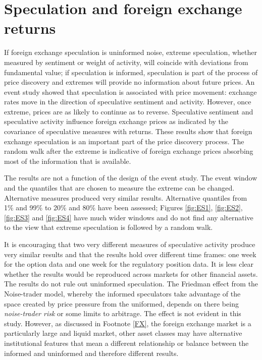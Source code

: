 \documentclass[preprint,12pt,authoryear]{elsarticle}
\begin{document}
\section{Speculation and foreign exchange returns}
If foreign exchange speculation is uninformed noise, extreme speculation, whether measured by sentiment or weight of activity, will coincide with deviations from fundamental value; if speculation is informed, speculation is part of the process of price discovery and extremes will provide no information about future prices. An event study showed that speculation is associated with price movement: exchange rates move in the direction of speculative sentiment and activity.  However, once extreme, prices are as likely to continue as to reverse. Speculative sentiment and speculative activity influence foreign exchange prices as indicated by the covariance of speculative measures with returns.  These results show that foreign exchange speculation is an important part of the price discovery process.  The random walk after the extreme is indicative of foreign exchange prices absorbing most of the information that is available.  
  
The results are not a function of the design of the event study.  The event window and the quantiles that are chosen to measure the extreme can be changed.  Alternative measures produced very similar results. Alternative quantiles from 1\% and 99\% to 20\% and 80\% have been assessed; Figures \ref{fig:ES1}, \ref{fig:ES2}, \ref{fig:ES3} and \ref{fig:ES4} have much wider windows and do not find any alternative to the view that extreme speculation is followed by a random walk. 


It is encouraging that two very different measures of speculative activity produce very similar results and that the results hold over different time frames: one week for the option data and one week for the regulatory position data.  It is less clear whether the results would be reproduced across markets for other financial assets. The results do not rule out uninformed speculation.  The Friedman effect from the Noise-trader model, whereby the informed speculators take advantage of the space created by price pressure from the uniformed, depends on there being \emph{noise-trader risk} or some limits to arbitrage.  The effect is not evident in this study.  However, as discussed in Footnote \ref{FX}, the foreign exchange market is a particularly large and liquid market, other asset classes may have alternative institutional features that mean a different relationship or balance between the informed and uninformed and therefore different results.  
\end{document}
